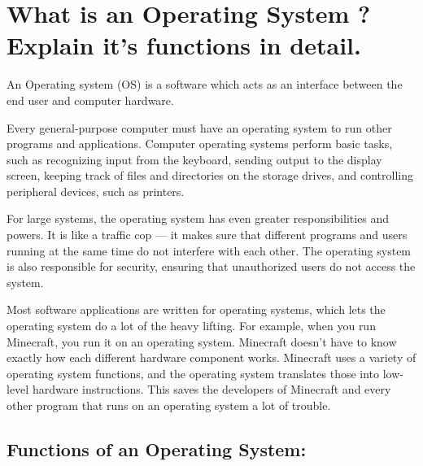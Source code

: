 \documentclass[10pt,a4paper,draft]{article}
\begin{document}
\section{What is an Operating System ? Explain it's functions in detail.}

An Operating system (OS) is a software which acts as an interface between the end user and computer hardware.

Every general-purpose computer must have an operating system to run other programs and applications. Computer operating systems perform basic tasks, such as recognizing input from the keyboard, sending output to the display screen, keeping track of files and directories on the storage drives, and controlling peripheral devices, such as printers. 

For large systems, the operating system has even greater responsibilities and powers. It is like a traffic cop — it makes sure that different programs and users running at the same time do not interfere with each other. The operating system is also responsible for security, ensuring that unauthorized users do not access the system.

Most software applications are written for operating systems, which lets the operating system do a lot of the heavy lifting. For example, when you run Minecraft, you run it on an operating system. Minecraft doesn’t have to know exactly how each different hardware component works. Minecraft uses a variety of operating system functions, and the operating system translates those into low-level hardware instructions. This saves the developers of Minecraft and every other program that runs on an operating system a lot of trouble.

\subsection{Functions of an Operating System:}
\end{document}

